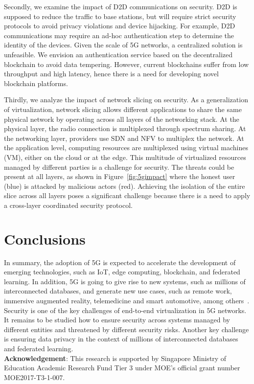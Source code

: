 \documentclass[11pt]{article}
\begin{document}
Secondly, we examine the impact of D2D communications on security. D2D is
supposed to reduce the traffic to base stations, but will require strict
security protocols to avoid privacy violations and device hijacking. For
example, D2D communications may require an ad-hoc authentication step to
determine the identity of the devices. Given the scale of 5G networks, a
centralized solution is unfeasible. We envision an authentication service based
on the decentralized blockchain to avoid data tempering. However, current
blockchains suffer from low throughput and high latency, hence there is a need
for developing novel blockchain platforms.

Thirdly, we analyze the impact of network slicing on security. As a
generalization of virtualization, network slicing allows different applications
to share the same physical network by operating across all layers of the
networking stack. At the physical layer, the radio connection is multiplexed
through spectrum sharing. At the networking layer, providers use SDN and NFV to
multiplex the network. At the application level, computing resources are
multiplexed using virtual machines (VM), either on the cloud or at the edge. This multitude
of virtualized resources managed by different parties is a challenge for
security. The threats could be present at all layers, as shown in
Figure~\ref{fig:5gimpact} where the honest user (blue) is attacked by malicious
actors (red). Achieving the isolation of the entire slice across all layers
poses a significant challenge because there is a need to apply a cross-layer
coordinated security protocol.

\vspace{-2mm}
\section{Conclusions}
\label{sec:conclusions}
\vspace{-1mm}

In summary, the adoption of 5G is expected to accelerate the development of
emerging technologies, such as IoT, edge computing, blockchain, and federated
learning. In addition, 5G is going to give rise to new systems, such as millions
of interconnected databases, and generate new use cases, such as remote work,
immersive augmented reality, telemedicine and smart automotive, among
others~\cite{5g_our_article}.
Security is one of the key challenges of end-to-end virtualization in 5G
networks. It remains to be studied how to ensure security across systems managed
by different entities and threatened by different security risks. Another key
challenge is ensuring data privacy in the context of millions of interconnected
databases and federated learning.
\vspace{1mm}
\\
\noindent \textbf{Acknowledgement}: This research is supported by Singapore
Ministry of Education Academic Research Fund Tier 3 under MOE’s official grant number
MOE2017-T3-1-007.
\end{document}
